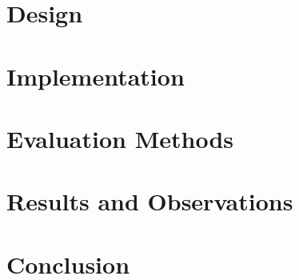 \documentclass[12pt, a4paper]{report}
\newenvironment{code}
{\footnotesize\verbatim}{\endverbatim\normalfont}
\theoremstyle{definition}
\theoremstyle{definition}%
\theoremstyle{definition}%
\theoremstyle{definition}%
\theoremstyle{definition}%
\theoremstyle{definition}%
\begin{document}
\chapter{Design} \label{chap:design}


\chapter{Implementation} \label{chap:implementation}


\chapter{Evaluation Methods} \label{chap:evaluation_methods}


\chapter{Results and Observations} \label{chap:results_observations}


\chapter{Conclusion} \label{chap:conclusion}


\appendix




\bibliomatter




\end{document}
